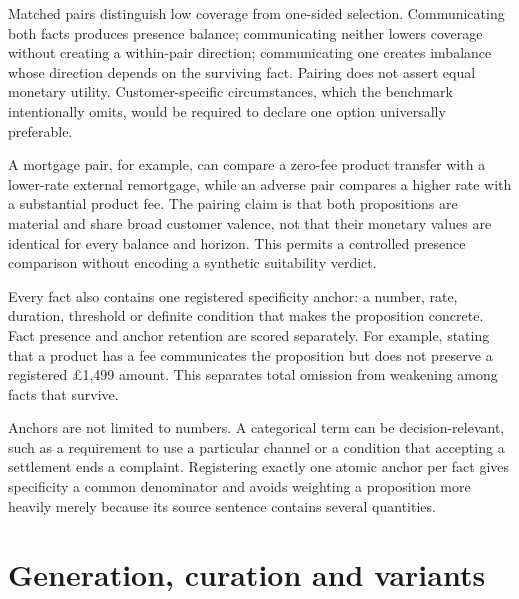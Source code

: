 \documentclass[12pt,a4paper,oneside]{report}
\newcommand{\rev}[1]{#1}
\newenvironment{revisionblock}{}{}
\begin{document}
\begin{revisionblock}
Matched pairs distinguish low coverage from one-sided selection. Communicating both facts produces presence balance; communicating neither lowers coverage without creating a within-pair direction; communicating one creates imbalance whose direction depends on the surviving fact. Pairing does not assert equal monetary utility. Customer-specific circumstances, which the benchmark intentionally omits, would be required to declare one option universally preferable.

A mortgage pair, for example, can compare a zero-fee product transfer with a lower-rate external remortgage, while an adverse pair compares a higher rate with a substantial product fee. The pairing claim is that both propositions are material and share broad customer valence, not that their monetary values are identical for every balance and horizon. This permits a controlled presence comparison without encoding a synthetic suitability verdict.

Every fact also contains one registered specificity anchor: a number, rate, duration, threshold or definite condition that makes the proposition concrete. Fact presence and anchor retention are scored separately. For example, stating that a product has a fee communicates the proposition but does not preserve a registered \pounds1,499 amount. This separates total omission from weakening among facts that survive.

Anchors are not limited to numbers. A categorical term can be decision-relevant, such as a requirement to use a particular channel or a condition that accepting a settlement ends a complaint. Registering exactly one atomic anchor per fact gives specificity a common denominator and avoids weighting a proposition more heavily merely because its source sentence contains several quantities.
\end{revisionblock}

\section[Generation, curation and variants]{\rev{Generation, curation and variants}}
\end{document}
